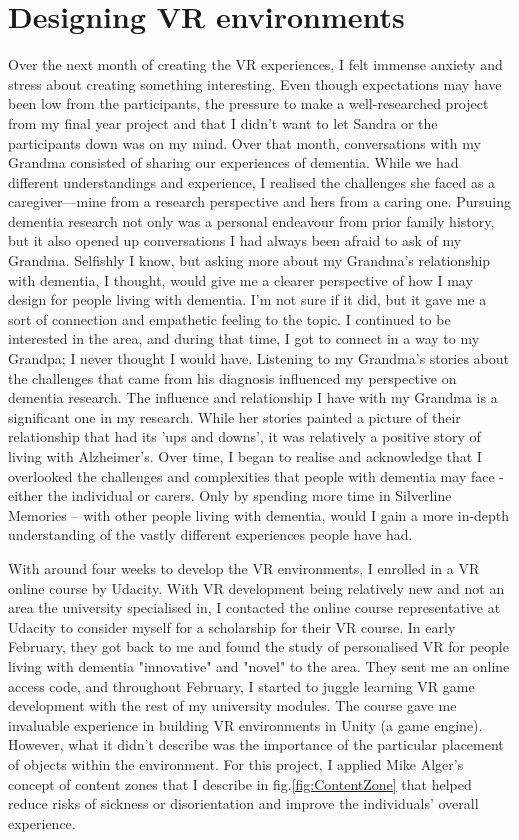 \section{Designing VR environments}
\label{Relationships:DesigningVR}
Over the next month of creating the VR experiences, I felt immense anxiety and stress about creating something interesting. Even though expectations may have been low from the participants, the pressure to make a well-researched project from my final year project and that I didn't want to let Sandra or the participants down was on my mind. Over that month, conversations with my Grandma consisted of sharing our experiences of dementia. While we had different understandings and experience, I realised the challenges she faced as a caregiver—mine from a research perspective and hers from a caring one. Pursuing dementia research not only was a personal endeavour from prior family history, but it also opened up conversations I had always been afraid to ask of my Grandma. Selfishly I know, but asking more about my Grandma's relationship with dementia, I thought, would give me a clearer perspective of how I may design for people living with dementia. I'm not sure if it did, but it gave me a sort of connection and empathetic feeling to the topic. I continued to be interested in the area, and during that time, I got to connect in a way to my Grandpa; I never thought I would have. Listening to my Grandma's stories about the challenges that came from his diagnosis influenced my perspective on dementia research.  The influence and relationship I have with my Grandma is a significant one in my research. While her stories painted a picture of their relationship that had its 'ups and downs', it was relatively a positive story of living with Alzheimer's. Over time, I began to realise and acknowledge that I overlooked the challenges and complexities that people with dementia may face - either the individual or carers. Only by spending more time in Silverline Memories – with other people living with dementia, would I gain a more in-depth understanding of the vastly different experiences people have had.  

With around four weeks to develop the VR environments, I enrolled in a VR online course by Udacity. With VR development being relatively new and not an area the university specialised in, I contacted the online course representative at Udacity to consider myself for a scholarship for their VR course. In early February, they got back to me and found the study of personalised VR for people living with dementia "innovative" and "novel" to the area. They sent me an online access code, and throughout February, I started to juggle learning VR game development with the rest of my university modules. The course gave me invaluable experience in building VR environments in Unity (a game engine). However, what it didn't describe was the importance of the particular placement of objects within the environment. For this project, I applied Mike Alger's \citep{alger_visual_2015} concept of content zones that I describe in fig.\ref{fig:ContentZone} that helped reduce risks of sickness or disorientation and improve the individuals' overall experience. 

